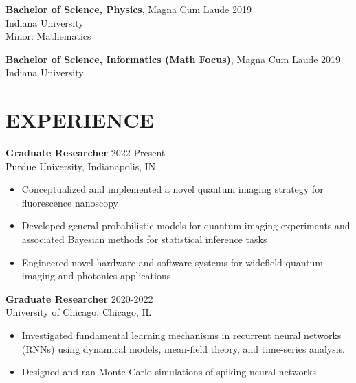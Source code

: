 \documentclass[margin, 10pt]{res} %
\begin{document}
\begin{resume}
\textbf{Bachelor of Science, Physics}, Magna Cum Laude \hfill 2019\\
Indiana University\\
Minor: Mathematics 

\textbf{Bachelor of Science, Informatics (Math Focus)}, Magna Cum Laude \hfill 2019\\
Indiana University\\


 
\section{EXPERIENCE}

\textbf{Graduate Researcher} \hfill 2022-Present \\
Purdue University, Indianapolis, IN

\begin{itemize} \itemsep -2pt %

\item Conceptualized and implemented a novel quantum imaging strategy for fluorescence nanoscopy 

\item Developed general probabilistic models for quantum imaging experiments and associated Bayesian methods for statistical inference tasks

\item Engineered novel hardware and software systems for widefield quantum imaging and photonics applications

\end{itemize}

\textbf{Graduate Researcher} \hfill 2020-2022 \\
University of Chicago, Chicago, IL

\begin{itemize} \itemsep -2pt %

\item Investigated fundamental learning mechanisms in recurrent neural networks (RNNs) using dynamical models, mean-field theory, and time-series analysis. 

\item Designed and ran Monte Carlo simulations of spiking neural networks 
 

\end{itemize}
\end{resume}
\end{document}
